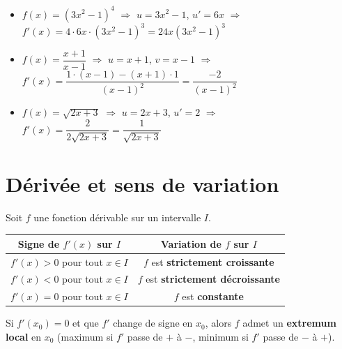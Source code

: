 \newpage
\begin{exemple}
  \begin{itemize}
    \item $f(x) = (3x^2 - 1)^4$
    \quad $\Rightarrow$ \quad $u = 3x^2-1$, $u' = 6x$
    \quad $\Rightarrow$ \quad $f'(x) = 4 \cdot 6x \cdot (3x^2-1)^3 = 24x(3x^2-1)^3$

    \medskip
    \item $f(x) = \dfrac{x+1}{x-1}$
    \quad $\Rightarrow$ \quad $u=x+1$, $v=x-1$
    \quad $\Rightarrow$ \quad $f'(x) = \dfrac{1\cdot(x-1) - (x+1)\cdot1}{(x-1)^2} = \dfrac{-2}{(x-1)^2}$

    \medskip
    \item $f(x) = \sqrt{2x+3}$
    \quad $\Rightarrow$ \quad $u = 2x+3$, $u' = 2$
    \quad $\Rightarrow$ \quad $f'(x) = \dfrac{2}{2\sqrt{2x+3}} = \dfrac{1}{\sqrt{2x+3}}$
  \end{itemize}
\end{exemple}

\section{D\'{e}riv\'{e}e et sens de variation}

\begin{theoreme}
  Soit $f$ une fonction d\'{e}rivable sur un intervalle $I$.

  \bigskip
  \begin{center}
  \renewcommand{\arraystretch}{1.8}
  \begin{tabular}{|c|c|}
    \hline
    \textbf{\color{navy}Signe de $f'(x)$ sur $I$}
      & \textbf{\color{navy}Variation de $f$ sur $I$} \\
    \hline\hline
    $f'(x) > 0$ pour tout $x \in I$ & $f$ est \textbf{strictement croissante} \\
    \hline
    $f'(x) < 0$ pour tout $x \in I$ & $f$ est \textbf{strictement d\'{e}croissante} \\
    \hline
    $f'(x) = 0$ pour tout $x \in I$ & $f$ est \textbf{constante} \\
    \hline
  \end{tabular}
  \end{center}
\end{theoreme}

\begin{remarque}
  Si $f'(x_0) = 0$ et que $f'$ change de signe en $x_0$,
  alors $f$ admet un \textbf{extremum local} en $x_0$
  (maximum si $f'$ passe de $+$ \`{a} $-$, minimum si $f'$ passe de $-$ \`{a} $+$).
\end{remarque}

